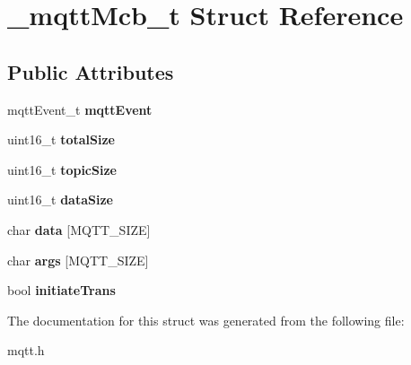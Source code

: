 \hypertarget{struct__mqttMcb__t}{}\section{\+\_\+mqtt\+Mcb\+\_\+t Struct Reference}
\label{struct__mqttMcb__t}
\subsection*{Public Attributes}
\begin{DoxyCompactItemize}
\item 
\mbox{\label{struct__mqttMcb__t_a2444e1da64e107ac3e38c67ca5c5bbed}} 
mqtt\+Event\+\_\+t {\bfseries mqtt\+Event}
\item 
\mbox{\label{struct__mqttMcb__t_a200ee8c05ebb39e64b7b66b7710dce0f}} 
uint16\+\_\+t {\bfseries total\+Size}
\item 
\mbox{\label{struct__mqttMcb__t_adb2a22865e9366348daa11bad69f3a1e}} 
uint16\+\_\+t {\bfseries topic\+Size}
\item 
\mbox{\label{struct__mqttMcb__t_ae44a8d1ad53b2786df67ab57179d50ae}} 
uint16\+\_\+t {\bfseries data\+Size}
\item 
\mbox{\label{struct__mqttMcb__t_a007841c0e069c54cc67965906022496a}} 
char {\bfseries data} \mbox{[}M\+Q\+T\+T\+\_\+\+S\+I\+ZE\mbox{]}
\item 
\mbox{\label{struct__mqttMcb__t_a26e0c1005309c7095d87a990914646c6}} 
char {\bfseries args} \mbox{[}M\+Q\+T\+T\+\_\+\+S\+I\+ZE\mbox{]}
\item 
\mbox{\label{struct__mqttMcb__t_aacc31f6cb888369dc2294e11898c3114}} 
bool {\bfseries initiate\+Trans}
\end{DoxyCompactItemize}


The documentation for this struct was generated from the following file\+:\begin{DoxyCompactItemize}
\item 
mqtt.\+h\end{DoxyCompactItemize}
